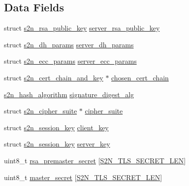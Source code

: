 \subsection*{Data Fields}
\begin{DoxyCompactItemize}
\item 
struct \hyperlink{structs2n__rsa__public__key}{s2n\+\_\+rsa\+\_\+public\+\_\+key} \hyperlink{structs2n__crypto__parameters_ac66524c1ba7864aa76ef5774384e7579}{server\+\_\+rsa\+\_\+public\+\_\+key}
\item 
struct \hyperlink{structs2n__dh__params}{s2n\+\_\+dh\+\_\+params} \hyperlink{structs2n__crypto__parameters_a3fee486205118888513b6ff2bdd5fb10}{server\+\_\+dh\+\_\+params}
\item 
struct \hyperlink{structs2n__ecc__params}{s2n\+\_\+ecc\+\_\+params} \hyperlink{structs2n__crypto__parameters_a1a6eac074b87a6fa3440ed9d4724d07d}{server\+\_\+ecc\+\_\+params}
\item 
struct \hyperlink{structs2n__cert__chain__and__key}{s2n\+\_\+cert\+\_\+chain\+\_\+and\+\_\+key} $\ast$ \hyperlink{structs2n__crypto__parameters_a20dd75e38ae2f99535e509425e4dface}{chosen\+\_\+cert\+\_\+chain}
\item 
\hyperlink{s2n__hash_8h_a45fca4e9152a9bfb4b15f8d9f1a074e5}{s2n\+\_\+hash\+\_\+algorithm} \hyperlink{structs2n__crypto__parameters_a76195ad1b96e7ecdec22ee893d81c6c7}{signature\+\_\+digest\+\_\+alg}
\item 
struct \hyperlink{structs2n__cipher__suite}{s2n\+\_\+cipher\+\_\+suite} $\ast$ \hyperlink{structs2n__crypto__parameters_a5446cce0337d14b74b38f2a81ea19670}{cipher\+\_\+suite}
\item 
struct \hyperlink{structs2n__session__key}{s2n\+\_\+session\+\_\+key} \hyperlink{structs2n__crypto__parameters_a5310bf07c6a3cac0ed09c19e967a8a27}{client\+\_\+key}
\item 
struct \hyperlink{structs2n__session__key}{s2n\+\_\+session\+\_\+key} \hyperlink{structs2n__crypto__parameters_a09fdc758a329111328b6a714fab83719}{server\+\_\+key}
\item 
uint8\+\_\+t \hyperlink{structs2n__crypto__parameters_aff85fd3b06a6aa697da1c520ee9f0714}{rsa\+\_\+premaster\+\_\+secret} \mbox{[}\hyperlink{tls_2s2n__crypto_8h_a3e2918bb353cd7e9f8bb6aab17214d98}{S2\+N\+\_\+\+T\+L\+S\+\_\+\+S\+E\+C\+R\+E\+T\+\_\+\+L\+EN}\mbox{]}
\item 
uint8\+\_\+t \hyperlink{structs2n__crypto__parameters_a5fe631e363754e6d6232fcbf54a771a6}{master\+\_\+secret} \mbox{[}\hyperlink{tls_2s2n__crypto_8h_a3e2918bb353cd7e9f8bb6aab17214d98}{S2\+N\+\_\+\+T\+L\+S\+\_\+\+S\+E\+C\+R\+E\+T\+\_\+\+L\+EN}\mbox{]}

\end{DoxyCompactItemize}
